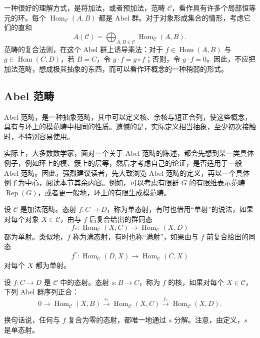 一种很好的理解方式，是将加法，或者预加法，范畴 $\mathcal{C}$，看作具有许多个局部恒等元的环。每个 $\operatorname{Hom}_{\mathcal{C}}(A,B)$ 都是 Abel 群。对于对象形成集合的情形，考虑它们的直和
\[
A(\mathcal{C})=\bigoplus_{A,B\in\mathcal{C}}
\operatorname{Hom}_{\mathcal{C}}(A,B).
\]
范畴的复合法则，在这个 Abel 群上诱导乘法：对于 $f\in\operatorname{Hom}(A,B)$ 与 $g\in\operatorname{Hom}(C,D)$，若 $B=C$，令 $g\cdot f=g\circ f$；否则，令 $g\cdot f=0$。因此，不应把加法范畴，想成极其抽象的东西，而可以看作环概念的一种稍弱的形式。

\subsection{Abel 范畴}\label{sec:4.1.4}

Abel 范畴，是一种抽象范畴，其中可以定义核、余核与短正合列，使这些概念，具有与环上的模范畴中相同的性质。遗憾的是，实际定义相当抽象，至少初次接触时，不特别容易使用。

实际上，大多数数学家，面对一个关于 Abel 范畴的陈述，都会先想到某一类具体例子，例如环上的模、簇上的层等，然后才考虑自己的论证，是否适用于一般 Abel 范畴。因此，强烈建议读者，先大致浏览 Abel 范畴的定义，再以一个具体例子为中心，阅读本节其余内容。例如，可以考虑有限群 $G$ 的有限维表示范畴 $\operatorname{Rep}(G)$，或者更一般地，环上的有限生成模范畴。

\begin{definition*}\label{def:4.monomorphism-epimorphism}
设 $\mathcal{C}$ 是加法范畴。态射 $f\colon C\to D$，称为单态射，有时也借用“单射”的说法，如果对每个对象 $X\in\mathcal{C}$，由与 $f$ 后复合给出的群同态
\[
f_*\colon\operatorname{Hom}_{\mathcal{C}}(X,C)
\longrightarrow\operatorname{Hom}_{\mathcal{C}}(X,D)
\]
都为单射。类似地，$f$ 称为满态射，有时也称“满射”，如果由与 $f$ 前复合给出的同态
\[
f^*\colon\operatorname{Hom}_{\mathcal{C}}(D,X)
\longrightarrow\operatorname{Hom}_{\mathcal{C}}(C,X)
\]
对每个 $X$ 都为单射。
\end{definition*}

\begin{definition*}\label{def:4.categorical-kernel}
设 $f\colon C\to D$ 是 $\mathcal{C}$ 中的态射。态射 $s\colon B\to C$，称为 $f$ 的核，如果对每个 $X\in\mathcal{C}$，下列 Abel 群序列正合：
\[
0\longrightarrow\operatorname{Hom}_{\mathcal{C}}(X,B)
\xrightarrow{s_*}\operatorname{Hom}_{\mathcal{C}}(X,C)
\xrightarrow{f_*}\operatorname{Hom}_{\mathcal{C}}(X,D).
\]
\end{definition*}
换句话说，任何与 $f$ 复合为零的态射，都唯一地通过 $s$ 分解。注意，由定义，$s$ 是单态射。

